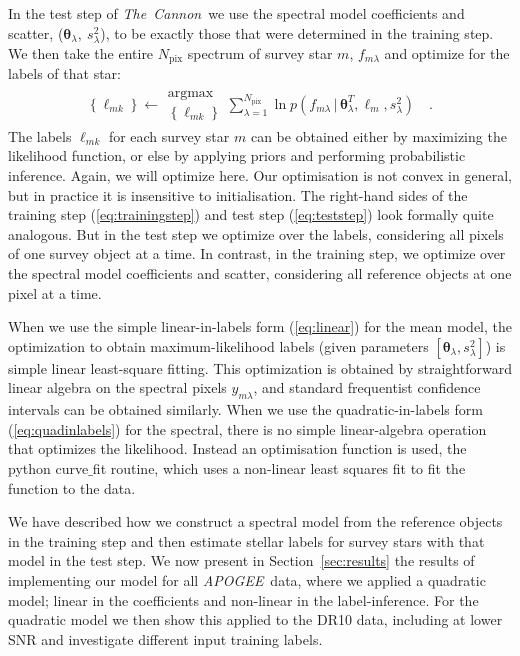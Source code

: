 \documentclass[12pt, preprint]{aastex}
\newcommand{\sectionname}{Section}
\newcommand{\tc}{\textsl{The~Cannon}}
\newcommand{\apogee}{\textsl{APOGEE}}
\newcommand{\set}[1]{\bm{#1}}
\newcommand{\starlabel}{\ell}
\newcommand{\starlabelvec}{\set{\starlabel}}
\newcommand{\given}{\,|\,}
\newcommand{\pix}{\mathrm{pix}}
\begin{document}
In the test step of \tc\ we use the spectral model coefficients and scatter,
($\set{\theta}_\lambda,\ s_\lambda^2$), to be exactly those that were determined in the training step.
We then take the entire $N_\pix$ spectrum of survey star $m$, $f_{m\lambda}$ and optimize for the labels of that star:
\begin{eqnarray}
\left\{\starlabel_{mk}\right\} \leftarrow \substack{\mbox{argmax}\\{\left\{\starlabel_{mk}\right\}}}
\sum_{\lambda=1}^{N_\pix}
\ln p(f_{m\lambda}\given\set{\theta}^T_\lambda, \starlabelvec_m, s_\lambda^2)
\label{eq:teststep}\quad .
\end{eqnarray}
The labels $\starlabel_{mk}$ for each survey star $m$ can be obtained either by maximizing
the likelihood function, or else by applying priors
and performing probabilistic inference.
Again, we will optimize here. Our optimisation is not convex in general, but in practice it is insensitive to initialisation.
The right-hand sides of the training step (\ref{eq:trainingstep}) and test step (\ref{eq:teststep}) look formally quite analogous.
But in the test step we optimize over the labels, considering all pixels of one survey object at a time. In contrast,
in the training step, we optimize over the spectral model coefficients and scatter, considering all reference objects
at one pixel at a time.

When we use the simple linear-in-labels form (\ref{eq:linear}) for the
mean model, the optimization to obtain maximum-likelihood labels
(given parameters $[\set{\theta}_\lambda, s_\lambda^2]$) is simple linear
least-square fitting.
This optimization is obtained by straightforward linear algebra on the
spectral pixels $y_{m\lambda}$, and standard frequentist confidence
intervals can be obtained similarly.
When we use the quadratic-in-labels form (\ref{eq:quadinlabels}) for the
spectral, there is no simple linear-algebra operation that
optimizes the likelihood. 
Instead an optimisation function is used, the python curve$\_$fit routine, which uses a non-linear least squares fit to fit the function to the data. 

We have described how we construct a spectral model from the reference objects in the training step and then 
estimate stellar labels for survey stars with that model in the test step. 
We now present in \sectionname~\ref{sec:results} the results of implementing our model for all \apogee\ data, where we applied a quadratic model; linear in the coefficients and non-linear in the label-inference.  
For the quadratic model we then show this applied to the DR10 data, including at lower SNR and investigate different input training labels. 
\end{document}
